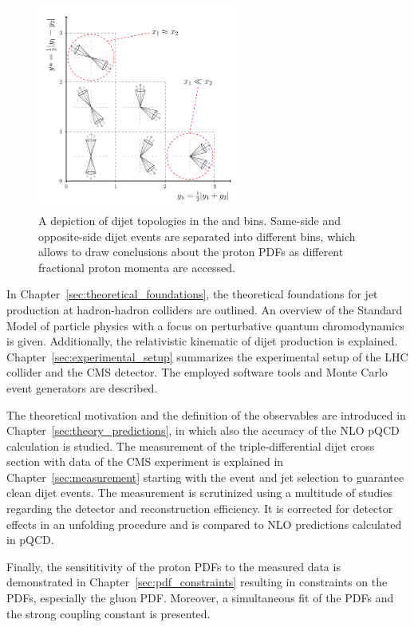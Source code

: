 \begin{figure}[htb]
    \centering
    \includegraphics[width=0.6\textwidth]{figures/drawings/ybys_hint.pdf}
    \caption{A depiction of dijet topologies in the \ystar and \yboost bins.
             Same-side and opposite-side dijet events are separated into
             different bins, which allows to draw conclusions about the proton
             PDFs as different fractional proton momenta are accessed.}
    \label{fig:intro_ybys_hint}
\end{figure}

In Chapter~\ref{sec:theoretical_foundations}, the theoretical foundations for
jet production at hadron-hadron colliders are outlined. An overview of the
Standard Model of particle physics with a focus on perturbative quantum
chromodynamics is given. Additionally, the relativistic kinematic of dijet
production is explained. Chapter~\ref{sec:experimental_setup} summarizes the
experimental setup of the LHC collider and the CMS detector. The
employed software tools and Monte Carlo event generators are described.

The theoretical motivation and the definition of the observables are introduced
in Chapter~\ref{sec:theory_predictions}, in which also the accuracy of the NLO
pQCD calculation is studied. The measurement of the triple-differential dijet
cross section with data of the CMS experiment is explained in
Chapter~\ref{sec:measurement} starting with the event and jet selection to
guarantee clean dijet events. The measurement is scrutinized using a multitude
of studies regarding the detector and reconstruction efficiency. It is corrected
for detector effects in an unfolding procedure and is compared to NLO
predictions calculated in pQCD.

Finally, the sensititivity of the proton PDFs to the measured data is
demonstrated in Chapter~\ref{sec:pdf_constraints} resulting in constraints on
the PDFs, especially the gluon PDF. Moreover, a simultaneous fit of the PDFs and
the strong coupling constant is presented.

